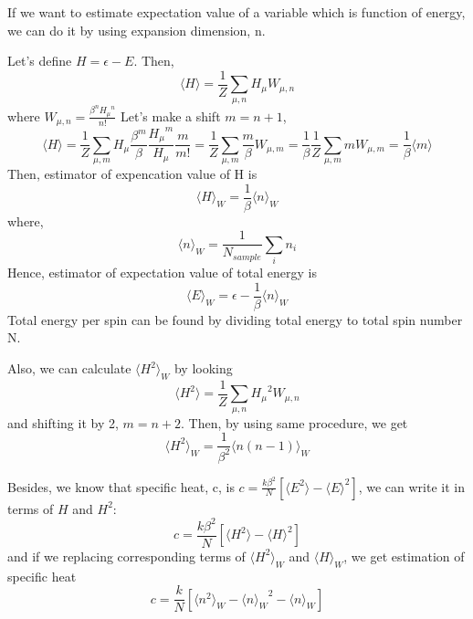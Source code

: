 \documentclass[12pt,fleqn]{report}
\begin{document}
If we want to estimate expectation value of a variable which is function of 
energy, we can do it by using expansion dimension, n.

Let's define $H= \epsilon - E$. Then,
\begin{equation}
\langle H \rangle = \frac{1}{Z} \sum_{\mu , n} H_\mu W_{\mu , n}
\end{equation}
where $W_{\mu , n} = \frac{\beta^n {H_{\mu}}^n}{n!}$
Let's make a shift $m=n+1$,
\begin{equation}
\langle H \rangle = \frac{1}{Z} \sum_{\mu, m} H_\mu \frac{\beta^m}{\beta} 
\frac{{H_{\mu}}^m}{H_\mu} \frac{m}{m!} = \frac{1}{Z} \sum_{\mu , m} 
\frac{m}{\beta} W_{\mu , m} = \frac{1}{\beta} \frac{1}{Z} \sum_{\mu , m} m 
W_{\mu , m} = \frac{1}{\beta} \langle m \rangle
\end{equation}
Then, estimator of expencation value of H is
\begin{equation}
\langle H \rangle_W = \frac{1}{\beta} \langle n \rangle_W
\end{equation}
where,
\begin{equation}
\langle n \rangle_W = \frac{1}{N_{sample}} \sum_i n_i
\end{equation}
Hence, estimator of expectation value of total energy is
\begin{equation}
\langle E \rangle_W = \epsilon - \frac{1}{\beta} \langle n \rangle_W
\end{equation}
Total energy per spin can be found by dividing total energy to total spin 
number N.

Also, we can calculate $\langle H^2 \rangle_W$ by looking
\begin{equation}
\langle H^2 \rangle = \frac{1}{Z} \sum_{\mu , n} {H_{\mu}}^2 W_{\mu , n}
\end{equation}
and shifting it by 2, $m = n + 2$. Then, by using same procedure, we get 
\begin{equation}
\langle H^2 \rangle_W = \frac{1}{\beta^2} \langle n(n-1) \rangle_W
\end{equation}

Besides, we know that specific heat, c, is $ c= \frac{k \beta^2}{N} [ \langle 
E^2 
\rangle - \langle E \rangle^2 ]$, we can write it in terms of $H$ and 
$H^2$:
\begin{equation}
c= \frac{k \beta^2}{N} [ \langle H^2 \rangle - \langle H \rangle^2 ]
\end{equation}
and if we replacing corresponding terms of $\langle H^2 \rangle_W$ and 
$\langle H \rangle_W$, we get estimation of specific heat
\begin{equation}
c = \frac{k}{N}[\langle n^2 \rangle_W - \langle n {\rangle_W}^2 - \langle n 
\rangle_W]
\end{equation}
\end{document}
